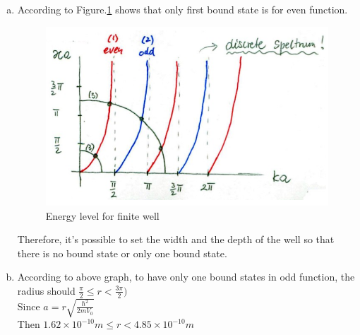 \documentclass[a4paper]{article}
\begin{document}
\begin{enumerate}[(a)]
    \item According to Figure.\ref{odd} shows that only first bound state is for even function.
    \begin{figure}[H]
        \centering
        \includegraphics[scale=0.3]{P1.png}
        \caption{Energy level for finite well}
        \label{odd}
    \end{figure}
    Therefore, it's possible to set the width and the depth of the well so that there is no bound state or only one bound state.
    \item According to above graph, to have only one bound states in odd function, the radius should $\frac{\pi}{2}\leq r<\frac{3\pi}
    {2})$
    \\Since $a=r\sqrt{\frac{\hbar^2}{2mV_0}}$
    \\Then $1.62\times10^{-10}m\leq r<4.85\times10^{-10}m$
\end{enumerate}
\end{document}
